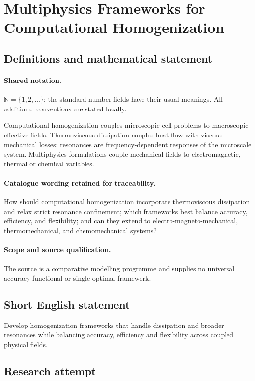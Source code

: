\documentclass[11pt]{article}
\begin{document}
\section{Multiphysics Frameworks for Computational Homogenization}\label{statement}

\subsection{Definitions and mathematical statement}

\paragraph{Shared notation.}$\mathbb N=\{1,2,\ldots\}$; the standard number fields have their usual meanings. All additional conventions are stated locally.


Computational homogenization couples microscopic cell problems to macroscopic effective fields. Thermoviscous dissipation couples heat flow with viscous mechanical losses; resonances are frequency-dependent responses of the microscale system. Multiphysics formulations couple mechanical fields to electromagnetic, thermal or chemical variables.

\paragraph{Catalogue wording retained for traceability.}
How should computational homogenization incorporate thermoviscous dissipation and relax strict resonance confinement; which frameworks best balance accuracy, efficiency, and flexibility; and can they extend to electro-magneto-mechanical, thermomechanical, and chemomechanical systems?

\paragraph{Scope and source qualification.}The source is a comparative modelling programme and supplies no universal accuracy functional or single optimal framework.
\subsection{Short English statement}
Develop homogenization frameworks that handle dissipation and broader resonances while balancing accuracy, efficiency and flexibility across coupled physical fields.
\subsection{Research attempt}
\end{document}
